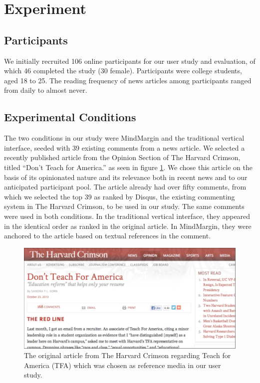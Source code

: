 \section{Experiment}

\subsection{Participants}
We initially recruited 106 online participants for our user study and evaluation, of which 46 completed the study (30 female). Participants were college students, aged 18 to 25. The reading frequency of news articles among participants ranged from daily to almost never. 

\subsection{Experimental Conditions}
The two conditions in our study were MindMargin and the traditional vertical interface, seeded with 39 existing comments from a news article. We selected a recently published article from the Opinion Section of The Harvard Crimson, titled “Don’t Teach for America.” as seen in figure \ref{fig:crimson}. We chose this article on the basis of its opinionated nature and its relevance both in recent news and to our anticipated participant pool. The article already had over fifty comments, from which we selected the top 39 as ranked by Disqus, the existing commenting system in The Harvard Crimson, to be used in our study. The same comments were used in both conditions. In the traditional vertical interface, they appeared in the identical order as ranked in the original article. In MindMargin, they were anchored to the article based on textual references in the comment.

\begin{figure}
\centering
\includegraphics[scale=0.25]{crimson.png}
\caption{The original article from The Harvard Crimson regarding Teach for America (TFA) which was chosen as reference media in our user study.}
\label{fig:crimson}
\end{figure}

